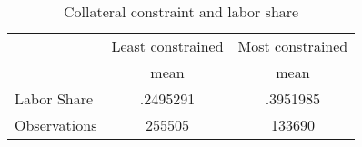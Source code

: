\begin{table}[htbp]\centering
\def\sym#1{\ifmmode^{#1}\else\(^{#1}\)\fi}
\caption{Collateral constraint and labor share}
\begin{tabular}{l*{2}{c}}
\toprule
                    &\multicolumn{1}{c}{Least constrained}&\multicolumn{1}{c}{Most constrained}\\
                    &        mean&        mean\\
\midrule
Labor Share         &    .2495291&    .3951985\\
\midrule
Observations        &      255505&      133690\\
\bottomrule
\end{tabular}
\end{table}
